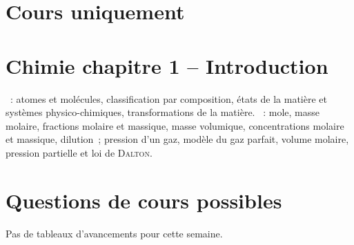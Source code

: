 \documentclass[a4paper, 12pt, final, garamond]{book}
\begin{document}
\section{Cours uniquement}
\section*{Chimie chapitre 1 -- Introduction}
\begin{enumerate}[label=\Roman*]
  ~: atomes et molécules, classification par
        composition, états de la matière et systèmes physico-chimiques,
        transformations de la matière.
  ~: mole, masse molaire, fractions
        molaire et massique, masse volumique, concentrations molaire et
        massique, dilution~; pression d'un gaz, modèle du gaz parfait, volume
        molaire, pression partielle et loi de \textsc{Dalton}.
\end{enumerate}

\section{Questions de cours possibles}
\begin{center}
  \begin{framed}
    \Large
    Pas de tableaux d'avancements pour cette semaine.
  \end{framed}
\end{center}
\end{document}
